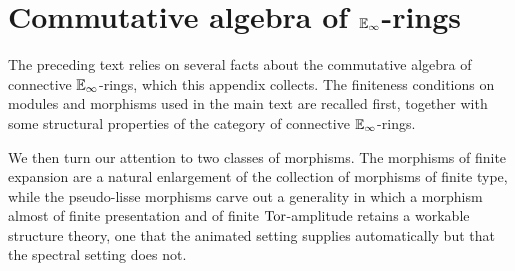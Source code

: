 \section{Commutative algebra of \texorpdfstring{$\mathbb{E}_{\infty}$}{E-infinity}-rings}\label{app: commutative algebra}
The preceding text relies on several facts about the commutative algebra of connective $\mathbb{E}_{\infty}$-rings, which this appendix collects. The finiteness conditions on modules and morphisms used in the main text are recalled first, together with some structural properties of the category of connective $\mathbb{E}_{\infty}$-rings. 

We then turn our attention to two classes of morphisms. The morphisms of finite expansion are a natural enlargement of the collection of morphisms of finite type, while the pseudo-lisse morphisms carve out a generality in which a morphism almost of finite presentation and of finite $\mathrm{Tor}$-amplitude retains a workable structure theory, one that the animated setting supplies automatically but that the spectral setting does not.
